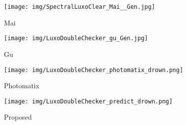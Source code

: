 \documentclass[journal]{IEEEtran}
\begin{document}
\begin{figure*}[tb]
        \label{fig:mean and std of nets}
        \centering
        \begin{subfigure}[b]{0.245\textwidth}
            \centering
            \texttt{[image: img/SpectralLuxoClear\_Mai\_\_Gen.jpg]}
            \caption[]%
            {{\small Mai \cite{mai2011optimizing} }}    
            \label{fig:mean and std of net14}
        \end{subfigure}
        \begin{subfigure}[b]{0.245\textwidth}  
            \centering 
            \texttt{[image: img/LuxoDoubleChecker\_gu\_Gen.jpg]}
            \caption[]%
            {{\small Gu \cite{gu2013local} }}    
            \label{fig:mean and std of net24}
        \end{subfigure}
        \begin{subfigure}[b]{0.245\textwidth}   
            \centering 
            \texttt{[image: img/LuxoDoubleChecker\_photomatix\_drown.png]}
            \caption[]%
            {{\small Photomatix \cite{photomatrix} }}    
            \label{fig:mean and std of net34}
        \end{subfigure}
        \begin{subfigure}[b]{0.245\textwidth}   
            \centering 
            \texttt{[image: img/LuxoDoubleChecker\_predict\_drown.png]}
            \caption[]%
            {{\small Proposed  }}    
            \label{fig:mean and std of net44}
        \end{subfigure}
        \label{fig:mean and std of nets}

        

\end{figure*}
\end{document}
